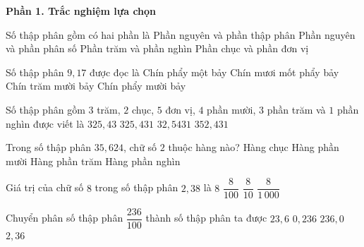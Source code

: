 \textbf{Phần 1. Trắc nghiệm lựa chọn}

\begin{ex} %
Số thập phân gồm có hai phần là
\choice
{\True Phần nguyên và phần thập phân}
{Phần nguyên và phần phân số}
{Phần trăm và phần nghìn}
{Phần chục và phần đơn vị}
\end{ex}

\begin{ex} %
Số thập phân $9{,}17$ được đọc là
\choice
{Chín phẩy một bảy}
{Chín mươi mốt phẩy bảy}
{Chín trăm mười bảy}
{\True Chín phẩy mười bảy}
\end{ex}

\begin{ex} %
Số thập phân gồm $3$ trăm, $2$ chục, $5$ đơn vị, $4$ phần mười, $3$ phần trăm và $1$ phần nghìn được viết là
\choice
{$325{,}43$}
{\True $325{,}431$}
{$32{,}5431$}
{$352{,}431$}
\end{ex}

\begin{ex} %
Trong số thập phân $35{,}624$, chữ số $2$ thuộc hàng nào?
\choice
{Hàng chục}
{Hàng phần mười}
{\True Hàng phần trăm}
{Hàng phần nghìn}
\end{ex}

\begin{ex} %
Giá trị của chữ số $8$ trong số thập phân $2{,}38$ là
\choice
{$8$}
{\True $\dfrac{8}{100}$}
{$\dfrac{8}{10}$}
{$\dfrac{8}{1\,000}$}
\end{ex}

\begin{ex} %
Chuyển phân số thập phân $\dfrac{236}{100}$ thành số thập phân ta được
\choice
{$23{,}6$}
{$0{,}236$}
{$236{,}0$}
{\True $2{,}36$}
\end{ex}


